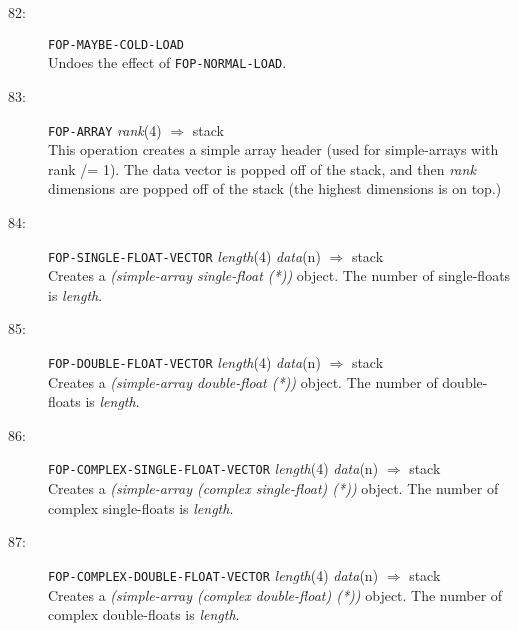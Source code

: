 \begin{description}
\item[82:] \hspace{2em} {\tt FOP-MAYBE-COLD-LOAD}\\
Undoes the effect of {\tt FOP-NORMAL-LOAD}. 

\item[83:] \hspace{2em} {\tt FOP-ARRAY} \hspace{2em} {\it rank}(4)
\hspace{2em} $\Rightarrow$ \hspace{2em} stack\\
This operation creates a simple array header (used for simple-arrays with rank
/= 1).  The data vector is popped off of the stack, and then {\it rank}
dimensions are popped off of the stack (the highest dimensions is on top.)

\item[84:] \hspace{2em} {\tt FOP-SINGLE-FLOAT-VECTOR} \hspace{2em} {\it length}(4) {\it data}(n)
 \hspace{2em} $\Rightarrow$ \hspace{2em} stack\\
Creates a {\it (simple-array single-float (*))} object.  The number of single-floats is {\it length}.

\item[85:] \hspace{2em} {\tt FOP-DOUBLE-FLOAT-VECTOR} \hspace{2em} {\it length}(4) {\it data}(n)
 \hspace{2em} $\Rightarrow$ \hspace{2em} stack\\
Creates a {\it (simple-array double-float (*))} object.  The number of double-floats is {\it length}.

\item[86:] \hspace{2em} {\tt FOP-COMPLEX-SINGLE-FLOAT-VECTOR} \hspace{2em} {\it length}(4) {\it data}(n)
 \hspace{2em} $\Rightarrow$ \hspace{2em} stack\\
Creates a {\it (simple-array (complex single-float) (*))} object.  The number of complex single-floats is {\it length}.

\item[87:] \hspace{2em} {\tt FOP-COMPLEX-DOUBLE-FLOAT-VECTOR} \hspace{2em} {\it length}(4) {\it data}(n)
 \hspace{2em} $\Rightarrow$ \hspace{2em} stack\\
Creates a {\it (simple-array (complex double-float) (*))} object.  The number of complex double-floats is {\it length}.


\end{description}
